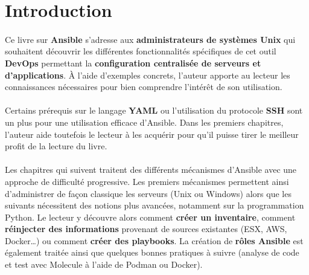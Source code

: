 \documentclass[hidelinks]{article}
\begin{document}
\title{\vspace{-0.5cm}{\Huge Ansible \\[1ex] \LARGE Gérez la configuration de vos serveurs et le déploiement de vos applications (3e édition)} \vspace{-1cm}}

\author{}

\maketitle
\clearpage

\tableofcontents
\clearpage

\section{Introduction}
\paragraph{}
Ce livre sur \textbf{Ansible} s'adresse aux \textbf{administrateurs de systèmes Unix} qui souhaitent découvrir les différentes fonctionnalités spécifiques de cet outil \textbf{DevOps} permettant la \textbf{configuration centralisée de serveurs et d'applications}. À l'aide d'exemples concrets, l'auteur apporte au lecteur les connaissances nécessaires pour bien comprendre l'intérêt de son utilisation.

\paragraph{}
Certains prérequis sur le langage \textbf{YAML} ou l'utilisation du protocole \textbf{SSH} sont un plus pour une utilisation efficace d'Ansible. Dans les premiers chapitres, l'auteur aide toutefois le lecteur à les acquérir pour qu'il puisse tirer le meilleur profit de la lecture du livre.

\paragraph{}
Les chapitres qui suivent traitent des différents mécanismes d'Ansible avec une approche de difficulté progressive. Les premiers mécanismes permettent ainsi d'administrer de façon classique les serveurs (Unix ou Windows) alors que les suivants nécessitent des notions plus avancées, notamment sur la programmation Python. Le lecteur y découvre alors comment \textbf{créer un inventaire}, comment \textbf{réinjecter des informations} provenant de sources existantes (ESX, AWS, Docker\dots) ou comment \textbf{créer des playbooks}. La création de \textbf{rôles Ansible} est également traitée ainsi que quelques bonnes pratiques à suivre (analyse de code et test avec Molecule à l'aide de Podman ou Docker).
\end{document}
